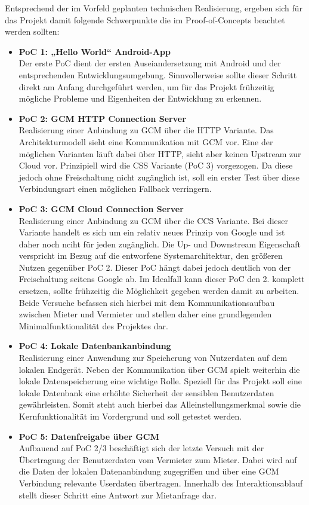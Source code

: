 Entsprechend der im Vorfeld geplanten technischen Realisierung, ergeben sich für das Projekt damit folgende Schwerpunkte die im Proof-of-Concepts beachtet werden sollten:\\
\begin{itemize}
   \item \textbf{PoC 1: „Hello World“ Android-App} \\
   Der erste PoC dient der ersten Auseiandersetzung mit Android und der entsprechenden Entwicklungsumgebung. Sinnvollerweise sollte dieser Schritt direkt am Anfang durchgeführt werden, um für das Projekt frühzeitig mögliche Probleme und Eigenheiten der Entwicklung zu erkennen.

   \item \textbf{PoC 2: GCM HTTP Connection Server} \\
   Realisierung einer Anbindung zu GCM über die HTTP Variante. Das Architekturmodell sieht eine Kommunikation mit GCM vor. Eine der möglichen Varianten läuft dabei über HTTP, sieht aber keinen Upstream zur Cloud vor. Prinzipiell wird die CSS Variante (PoC 3) vorgezogen. Da diese jedoch ohne Freischaltung nicht zugänglich ist, soll ein erster Test über diese Verbindungsart einen möglichen Fallback verringern.

   \item \textbf{PoC 3: GCM Cloud Connection Server} \\
   Realisierung einer Anbindung zu GCM über die CCS Variante. Bei dieser Variante handelt es sich um ein relativ neues Prinzip von Google und ist daher noch nciht für jeden zugänglich. Die Up- und Downstream Eigenschaft verspricht im Bezug auf die entworfene Systemarchitektur, den größeren Nutzen gegenüber PoC 2. 
   Dieser PoC hängt dabei jedoch deutlich von der Freischaltung seitens Google ab. Im Idealfall kann dieser PoC den 2. komplett ersetzen, sollte frühzeitig die Möglichkeit gegeben werden damit zu arbeiten.
   Beide Versuche befassen sich hierbei mit dem Kommunikationsaufbau zwischen Mieter und Vermieter und stellen daher eine grundlegenden Minimalfunktionalität des Projektes dar.

   \item \textbf{PoC 4: Lokale Datenbankanbindung} \\
   Realisierung einer Anwendung zur Speicherung von Nutzerdaten auf dem lokalen Endgerät.
   Neben der Kommunikation über GCM spielt weiterhin die lokale Datenspeicherung eine wichtige Rolle. Speziell für das Projekt soll eine lokale Datenbank eine erhöhte Sicherheit der sensiblen Benutzerdaten gewährleisten. Somit steht auch hierbei das Alleinstellungsmerkmal sowie die Kernfunktionalität im Vordergrund und soll getestet werden.

   \item \textbf{PoC 5: Datenfreigabe über GCM} \\
   Aufbauend auf PoC 2/3 beschäftigt sich der letzte Versuch mit der Übertragung der Benutzerdaten vom Vermieter zum Mieter. Dabei wird auf die Daten der lokalen Datenanbindung zugegriffen und über eine GCM Verbindung relevante Userdaten übertragen. Innerhalb des Interaktionsablauf stellt dieser Schritt eine Antwort zur Mietanfrage dar.
   
\end{itemize}

